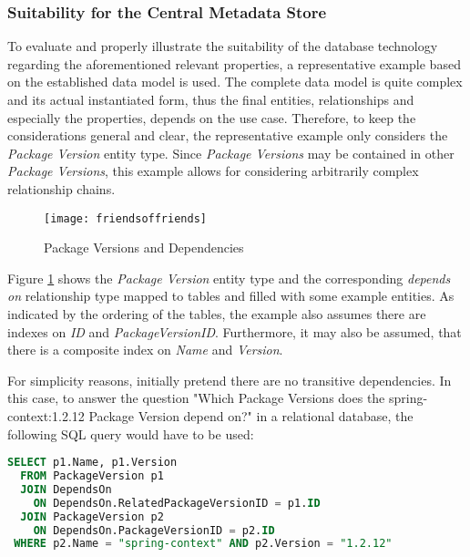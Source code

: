 \subsubsection{Suitability for the Central Metadata Store}
To evaluate and properly illustrate the suitability of the database technology regarding the aforementioned relevant properties, a representative example based on the established data model is used. The complete data model is quite complex and its actual instantiated form, thus the final entities, relationships and especially the properties, depends on the use case. Therefore, to keep the considerations general and clear, the representative example only considers the \emph{Package Version} entity type. Since \emph{Package Versions} may be contained in other \emph{Package Versions}, this example allows for considering arbitrarily complex relationship chains.\par

\begin{figure}[H]
	\centering
	\texttt{[image: friendsoffriends]}
	\caption[Package Versions and Dependencies]{Package Versions and Dependencies }
	\label{fig:PackageVersionsAndDependencies}
\end{figure}

Figure \ref{fig:PackageVersionsAndDependencies} shows the \emph{Package Version} entity type and the corresponding \emph{depends on} relationship type mapped to tables and filled with some example entities.  As indicated by the ordering of the tables, the example also assumes there are indexes on \emph{ID} and \emph{PackageVersionID}. Furthermore, it may also be assumed, that there is a composite index on \emph{Name} and \emph{Version}.\par
For simplicity reasons, initially pretend there are no transitive dependencies. In this case, to answer the question "Which Package Versions does the spring-context:1.2.12 Package Version depend on?" in a relational database, the following SQL query would have to be used:

\begin{lstlisting}[language=SQL, caption=Package Version Dependencies, captionpos=b, label=lst:PackageVersionDependencies]
SELECT p1.Name, p1.Version
  FROM PackageVersion p1 
  JOIN DependsOn
    ON DependsOn.RelatedPackageVersionID = p1.ID
  JOIN PackageVersion p2
    ON DependsOn.PackageVersionID = p2.ID
 WHERE p2.Name = "spring-context" AND p2.Version = "1.2.12"
\end{lstlisting}

